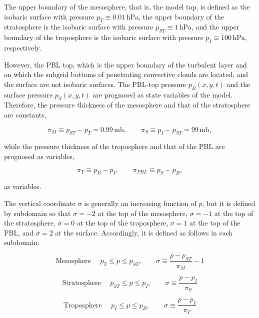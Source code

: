 \documentclass[12pt,openany]{book}
\begin{document}
The upper boundary of the mesosphere, that is, the model top, is
defined as the isobaric surface with pressure
$p_T \equiv 0.01\,\mathrm{hPa}$,
the upper boundary of the stratosphere is the isobaric surface with
pressure
$p_{ST} \equiv 1\,\mathrm{hPa}$,
and the upper boundary of the troposphere is the isobaric surface
with pressure
$p_I \equiv 100\,\mathrm{hPa}$,
respectively.

However, the PBL top, which is the upper boundary of the turbulent
layer and on which the subgrid bottoms of penetrating convective
clouds are located, and the surface are not isobaric surfaces.
The PBL‑top pressure $p_B(x,y,t)$ and the surface pressure
$p_S(x,y,t)$ are prognosed as state variables of the model.
Therefore, the pressure thickness of the mesosphere and that of the
stratosphere are constants,

\begin{equation*}
\pi_M \equiv p_{ST} - p_T = 0.99\,\mathrm{mb},
\qquad
\pi_S \equiv p_I - p_{ST} = 99\,\mathrm{mb},
\end{equation*}

while the pressure thickness of the troposphere and that of the PBL
are prognosed as variables,

\begin{equation*}
\pi_T \equiv p_B - p_I,
\qquad
\pi_{PBL} \equiv p_S - p_B,
\end{equation*}

as variables.

The vertical coordinate $\sigma$ is generally an increasing function of
$p$, but it is defined by subdomain so that
$\sigma = -2$ at the top of the mesosphere,
$\sigma = -1$ at the top of the stratosphere,
$\sigma = 0$ at the top of the troposphere,
$\sigma = 1$ at the top of the PBL,
and $\sigma = 2$ at the surface.
Accordingly, it is defined as follows in each subdomain:

\begin{equation}
\text{Mesosphere } \quad
p_T \le p \le p_{ST},
\qquad
\sigma \equiv \frac{p - p_{ST}}{\pi_M} - 1
\tag{3.1a}
\label{3.1a}
\end{equation}

\begin{equation}
\text{Stratosphere } \quad
p_{ST} \le p \le p_I,
\qquad
\sigma \equiv \frac{p - p_I}{\pi_S}
\tag{3.1b}
\label{3.1b}
\end{equation}

\begin{equation}
\text{Troposphere } \quad
p_I \le p \le p_B,
\qquad
\sigma \equiv \frac{p - p_I}{\pi_T}
\tag{3.1c}
\label{3.1c}
\end{equation}
\end{document}
